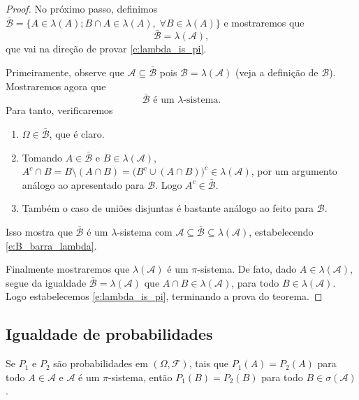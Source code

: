\begin{proof}
  No próximo passo, definimos $\bar{\mathcal{B}} = \{A \in \lambda(A); \text{$B \cap A \in \lambda(A), \; \forall B \in \lambda(A)$}\}$ e mostraremos que
  \begin{equation}
    \label{e:Bbar_igual_lambda}
    \bar{\mathcal{B}} = \lambda(\mathcal{A}),
  \end{equation}
  que vai na direção de provar \eqref{e:lambda_is_pi}.

  Primeiramente, observe que $\mathcal{A} \subseteq \bar{\mathcal{B}}$ pois $\mathcal{B} = \lambda(\mathcal{A})$ (veja a definição de $\mathcal{B}$).
  Mostraremos agora que
  \begin{equation}
    \label{e:B_barra_lambda}
    \text{$\bar{\mathcal{B}}$ é um $\lambda$-sistema}.
  \end{equation}
  Para tanto, verificaremos
  \begin{enumerate}[\quad a)]
  \item $\Omega \in \bar{\mathcal{B}}$, que é claro.
  \item Tomando $A \in \bar{\mathcal{B}}$ e $B \in \lambda(\mathcal{A})$, $A^c \cap B = B \setminus (A \cap B) = \big(B^c \cup (A \cap B)\big)^c \in \lambda(\mathcal{A})$, por um argumento análogo ao apresentado para $\mathcal{B}$.
    Logo $A^c \in \bar{\mathcal{B}}$.
  \item Também o caso de uniões disjuntas é bastante análogo ao feito para $\mathcal{B}$.
  \end{enumerate}
  Isso mostra que $\bar{\mathcal{B}}$ é um $\lambda$-sistema com $\mathcal{A} \subseteq \bar{\mathcal{B}} \subseteq \lambda(\mathcal{A})$, estabelecendo \eqref{e:B_barra_lambda}.

  Finalmente mostraremos que $\lambda(\mathcal{A})$ é um $\pi$-sistema.
  De fato, dado $A \in \lambda(\mathcal{A})$, segue da igualdade $\bar{\mathcal{B}} = \lambda(\mathcal{A})$ que $A \cap B \in \lambda(\mathcal{A})$, para todo $B \in \lambda(\mathcal{A})$.
  Logo estabelecemos \eqref{e:lambda_is_pi}, terminando a prova do teorema.
\end{proof}

\subsection{Igualdade de probabilidades}

\begin{proposition}
  \label{p:P12_equal_pi}
  Se $P_1$ e $P_2$ são probabilidades em $(\Omega, \mathcal{F})$, tais que $P_1(A) = P_2(A)$ para todo $A \in \mathcal{A}$ e $\mathcal{A}$ é
  um $\pi$-sistema, então $P_1(B) = P_2(B)$ para todo $B \in \sigma(\mathcal{A})$.
\end{proposition}

